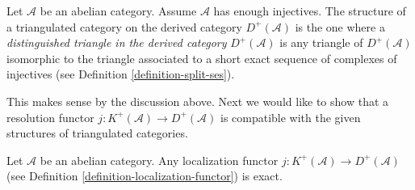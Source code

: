 \begin{definition}
\label{definition-derived-triangulated}
Let $\mathcal{A}$ be an abelian category.
Assume $\mathcal{A}$ has enough injectives.
The structure of a triangulated category on
the derived category $D^{+}(\mathcal{A})$ is the one where
a {\it distinguished triangle in the derived category}
$D^{+}(\mathcal{A})$ is any triangle of $D^{+}(\mathcal{A})$
isomorphic to the triangle associated to a short exact sequence
of complexes of injectives (see Definition \ref{definition-split-ses}).
\end{definition}

\noindent
This makes sense by the discussion above.
Next we would like to show that a resolution
functor $j : K^{+}(\mathcal{A}) \to D^{+}(\mathcal{A})$
is compatible with the given structures of triangulated
categories.

\begin{lemma}
\label{lemma-j-is-exact}
Let $\mathcal{A}$ be an abelian category.
Any localization functor
$j : K^{+}(\mathcal{A}) \to D^{+}(\mathcal{A})$
(see Definition \ref{definition-localization-functor})
is exact.
\end{lemma}

